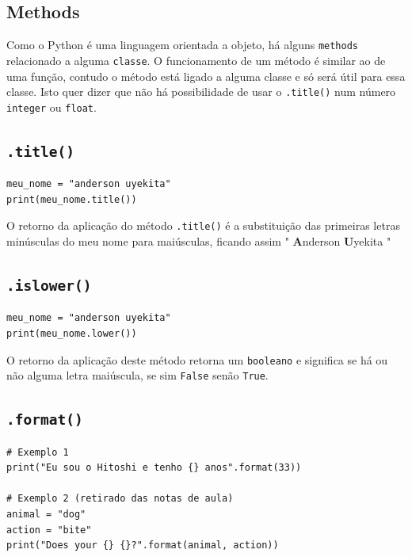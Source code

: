 \documentclass[]{book}
\begin{document}
\subsection{Methods}\label{methods}

Como o Python é uma linguagem orientada a objeto, há alguns
\texttt{methods} relacionado a alguma \texttt{classe}. O funcionamento
de um método é similar ao de uma função, contudo o método está ligado a
alguma classe e só será útil para essa classe. Isto quer dizer que não
há possibilidade de usar o \texttt{.title()} num número \texttt{integer}
ou \texttt{float}.

\subsection{\texorpdfstring{\texttt{.title()}}{.title()}}\label{title}

\begin{verbatim}
meu_nome = "anderson uyekita"
print(meu_nome.title())
\end{verbatim}

O retorno da aplicação do método \texttt{.title()} é a substituição das
primeiras letras minúsculas do meu nome para maiúsculas, ficando assim "
\textbf{A}nderson \textbf{U}yekita "

\subsection{\texorpdfstring{\texttt{.islower()}}{.islower()}}\label{islower}

\begin{verbatim}
meu_nome = "anderson uyekita"
print(meu_nome.lower())
\end{verbatim}

O retorno da aplicação deste método retorna um \texttt{booleano} e
significa se há ou não alguma letra maiúscula, se sim \texttt{False}
senão \texttt{True}.

\subsection{\texorpdfstring{\texttt{.format()}}{.format()}}\label{format}

\begin{verbatim}
# Exemplo 1
print("Eu sou o Hitoshi e tenho {} anos".format(33))

# Exemplo 2 (retirado das notas de aula)
animal = "dog"
action = "bite"
print("Does your {} {}?".format(animal, action))
\end{verbatim}
\end{document}
